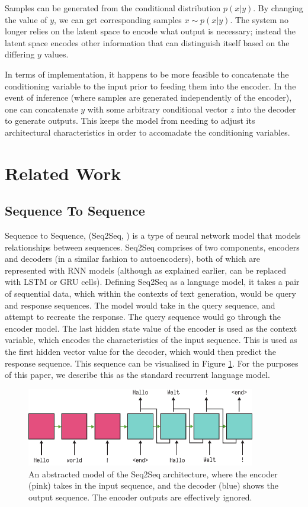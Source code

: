 \documentclass[12pt,twoside]{report}
\begin{document}
Samples can be generated from the conditional distribution $p(x|y)$. By changing the value of $y$, we can get corresponding samples $x \sim p(x|y)$. The system no longer relies on the latent space to encode what output is necessary; instead the latent space encodes other information that can distinguish itself based on the differing $y$ values.

In terms of implementation, it happens to be more feasible to concatenate the conditioning variable to the input prior to feeding them into the encoder. In the event of inference (where samples are generated independently of the encoder), one can concatenate $y$ with some arbitrary conditional vector $z$ into the decoder to generate outputs. This keeps the model from needing to adjust its architectural characteristics in order to accomadate the conditioning variables.

\section{Related Work}


\subsection{Sequence To Sequence}
\label{seq2seq}

Sequence to Sequence, (Seq2Seq, \cite{sutskever_sequence_2014}) is a type of neural network model that models relationships between sequences.  Seq2Seq comprises of two components, encoders and decoders (in a similar fashion to autoencoders), both of which are represented with RNN models (although as explained earlier, can be replaced with LSTM or GRU cells). Defining Seq2Seq as a language model, it takes a pair of sequential data, which within the contexts of text generation, would be query and response sequences. The model would take in the query sequence, and attempt to recreate the response. The query sequence would go through the encoder model. The last hidden state value of the encoder is used as the context variable, which encodes the characteristics of the input sequence. This is used as the first hidden vector value for the decoder, which would then predict the response sequence. This sequence can be visualised in Figure \ref{seq2seq_diagram}. For the purposes of this paper, we describe this as the standard recurrent language model.

\begin{figure}[!ht]
		
\centering
\includegraphics[width=100mm]{diagrams/seq2seq.pdf}
\caption{An abstracted model of the Seq2Seq architecture, where the encoder (pink) takes in the input sequence, and the decoder (blue) shows the output sequence. The encoder outputs are effectively ignored. \label{seq2seq_diagram}}
\end{figure}
\end{document}
